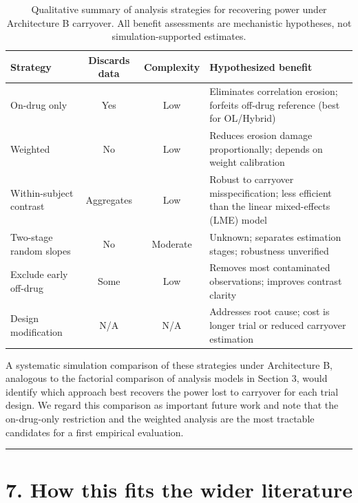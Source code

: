\documentclass[
  11pt,
]{article}
\begin{document}
\begin{table}[htbp]
\centering
\caption{Qualitative summary of analysis strategies for
recovering power under Architecture B carryover. All benefit
assessments are mechanistic hypotheses, not simulation-supported
estimates.}
\label{tab:sec6-strategies}
\begin{tabular}{lccp{5cm}}
\toprule
Strategy & Discards data & Complexity & Hypothesized benefit \\
\midrule
On-drug only & Yes & Low & Eliminates correlation erosion;
  forfeits off-drug reference (best for OL/Hybrid) \\
Weighted & No & Low & Reduces erosion damage proportionally;
  depends on weight calibration \\
Within-subject contrast & Aggregates & Low & Robust to
  carryover misspecification; less efficient than the linear
  mixed-effects (LME) model \\
Two-stage random slopes & No & Moderate & Unknown; separates
  estimation stages; robustness unverified \\
Exclude early off-drug & Some & Low & Removes most contaminated
  observations; improves contrast clarity \\
Design modification & N/A & N/A & Addresses root cause;
  cost is longer trial or reduced carryover estimation \\
\bottomrule
\end{tabular}
\end{table}

A systematic simulation comparison of these strategies under
Architecture B, analogous to the factorial comparison of analysis models
in Section 3, would identify which approach best recovers the power lost
to carryover for each trial design. We regard this comparison as
important future work and note that the on-drug-only restriction and the
weighted analysis are the most tractable candidates for a first
empirical evaluation.

\bigskip\noindent

\rule{\textwidth}{0.4pt}\bigskip

\section{7. How this fits the wider literature}
\end{document}
